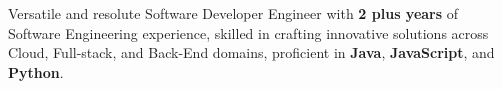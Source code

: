 \vspace{\SpacerAboveTopic}
\item{Versatile and resolute Software Developer Engineer with \textbf{2 plus years}} of Software Engineering experience, skilled in crafting innovative solutions across Cloud, Full-stack, and Back-End domains, proficient in \textbf{Java}, \textbf{JavaScript}, and \textbf{Python}.
\vspace{\SpacerBelowTopic}
